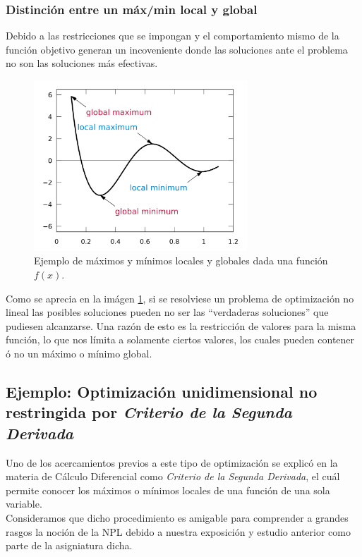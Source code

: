 \documentclass[letterpaper, 12pt]{article}
\begin{document}
    \subsubsection{Distinción entre un máx/min local y global}
    Debido a las restricciones que se impongan y el comportamiento mismo de la función objetivo generan un incoveniente donde las soluciones ante el problema no son las soluciones más efectivas.
    \begin{figure}[H]
        \centering
        \includegraphics[width=8cm]{ejemplomaxmins.png}
        \caption{Ejemplo de máximos y mínimos locales y globales dada una función \(f(x)\).}
        \label{fig:maxmins}
    \end{figure}
    \justify
    Como se aprecia en la imágen \ref{fig:maxmins}, si se resolviese un problema de optimización no lineal las posibles soluciones pueden no ser las ``verdaderas soluciones'' que pudiesen alcanzarse.
    Una razón de esto es la restricción de valores para la misma función, lo que nos límita a solamente ciertos valores, los cuales pueden contener ó no un máximo o mínimo global.
    \subsection{Ejemplo: Optimización unidimensional no restringida por \emph{Criterio de la Segunda Derivada}}
    Uno de los acercamientos previos a este tipo de optimización se explicó en la materia de Cálculo Diferencial como \emph{Criterio de la Segunda Derivada}, el cuál permite conocer los máximos o mínimos locales de
    una función de una sola variable. \\\newline Consideramos que dicho procedimiento es amigable para comprender a grandes rasgos la noción de la NPL debido a nuestra exposición y estudio anterior como parte de la asigniatura dicha.
\end{document}
